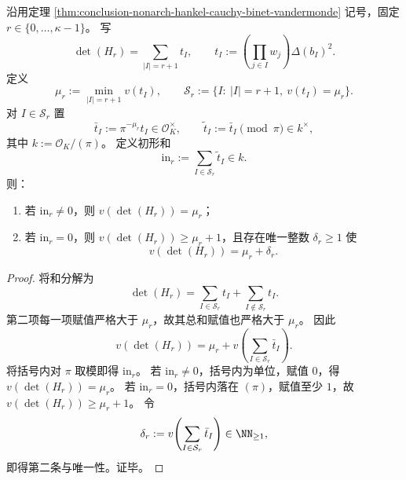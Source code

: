 \begin{theorem}\label{thm:conclusion-nonarch-hankel-initial-form-resonance}
沿用定理 \ref{thm:conclusion-nonarch-hankel-cauchy-binet-vandermonde} 记号，固定 \(r\in\{0,\dots,\kappa-1\}\)。
写
\[
\det(H_r)=\sum_{|I|=r+1}t_I,\qquad
t_I:=\left(\prod_{j\in I}w_j\right)\Delta(b_I)^2.
\]
定义
\[
\mu_r:=\min_{|I|=r+1}v(t_I),\qquad
\mathcal S_r:=\{I:\ |I|=r+1,\ v(t_I)=\mu_r\}.
\]
对 \(I\in\mathcal S_r\) 置
\[
\bar t_I:=\pi^{-\mu_r}t_I\in\mathcal O_K^\times,\qquad
\widetilde t_I:=\bar t_I\!\!\!\pmod{\pi}\in k^\times,
\]
其中 \(k:=\mathcal O_K/(\pi)\)。
定义初形和
\[
\mathrm{in}_r:=\sum_{I\in\mathcal S_r}\widetilde t_I\in k.
\]
则：
\begin{enumerate}
  \item 若 \(\mathrm{in}_r\neq 0\)，则 \(v(\det(H_r))=\mu_r\)；
  \item 若 \(\mathrm{in}_r=0\)，则 \(v(\det(H_r))\ge \mu_r+1\)，且存在唯一整数 \(\delta_r\ge 1\) 使
  \[
  v(\det(H_r))=\mu_r+\delta_r.
  \]
\end{enumerate}
\end{theorem}
\begin{proof}
将和分解为
\[
\det(H_r)
=
\sum_{I\in\mathcal S_r}t_I
+
\sum_{I\notin\mathcal S_r}t_I.
\]
第二项每一项赋值严格大于 \(\mu_r\)，故其总和赋值也严格大于 \(\mu_r\)。
因此
\[
v(\det(H_r))
=
\mu_r+v\!\left(\sum_{I\in\mathcal S_r}\bar t_I\right).
\]
将括号内对 \(\pi\) 取模即得 \(\mathrm{in}_r\)。
若 \(\mathrm{in}_r\neq 0\)，括号内为单位，赋值 \(0\)，得 \(v(\det(H_r))=\mu_r\)。
若 \(\mathrm{in}_r=0\)，括号内落在 \((\pi)\)，赋值至少 \(1\)，故 \(v(\det(H_r))\ge \mu_r+1\)。
令
\[
\delta_r:=v\!\left(\sum_{I\in\mathcal S_r}\bar t_I\right)\in\NN_{\ge 1},
\]
即得第二条与唯一性。证毕。
\end{proof}

